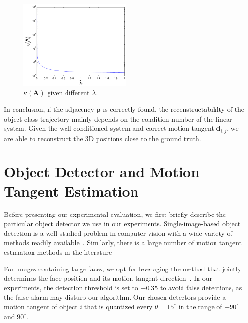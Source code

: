 \begin{figure}
\centering
\includegraphics[width=0.5\textwidth]{chapter4/resource/conditionNum_lamda.pdf}
\caption[Illustration of the system condition number given different weight $\lambda$.]{$\kappa(\mathbf{A})$ given different $\lambda$.}
\label{fig:conditionNum_lamda}
\end{figure}

In conclusion, if the adjacency $\mathbf{p}$ is correctly found, the reconstructabililty of the object class trajectory mainly depends on the condition number of the linear system. Given the well-conditioned system and correct motion tangent $\mathbf{d}_{i,j}$, we are able to reconstruct the 3D positions close to the ground truth.




\section{Object Detector and Motion Tangent Estimation}
\label{sec:face_detection}
Before presenting our experimental evaluation, we first briefly describe the particular object detector we use in our experiments.
Single-image-based object detection is a well studied problem in computer vision with a wide variety of methods readily available~\cite{Zhang2006Local,Dalal2005HOG,lsvm-pami}. Similarly, there is a large number of motion tangent estimation methods in the literature~\cite{Blanz2003face,Gu20063D,jain2010fddb,jones2003fast}.

For images containing large faces, we opt for leveraging the method that jointly determines the face position and its motion tangent direction~\cite{Xiangxin_CVPR12}.
In our experiments,
the detection threshold is set to $-0.35$ to avoid false detections, as the false alarm may disturb our algorithm. Our chosen detectors provide a motion tangent of object $i$ that is  quantized every $\theta=15^{\circ}$ in the range of $-90^{\circ}$ and $90^{\circ}$.


